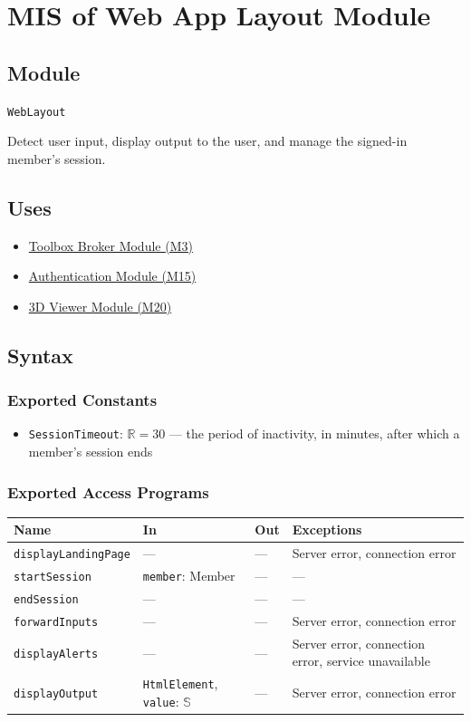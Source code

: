 \documentclass[12pt, titlepage]{article}
\begin{document}
\newpage

\section{MIS of Web App Layout Module} \label{mWebApp}

\subsection{Module}
\texttt{WebLayout}

Detect user input, display output to the user, and manage the signed-in member's session.

\subsection{Uses}
\begin{itemize}
  \item \hyperref[mBroker]{Toolbox Broker Module (M3)}
  \item \hyperref[mAuthn]{Authentication Module (M15)}
  \item \hyperref[mViewer]{3D Viewer Module (M20)}
\end{itemize}

\subsection{Syntax}

\subsubsection{Exported Constants}
\begin{itemize}
  \item \texttt{SessionTimeout}: $\mathbb{R} = 30$ --- the period of inactivity, in minutes, after which a member's session ends
\end{itemize}

\subsubsection{Exported Access Programs}
\begin{tabularx}{\textwidth}{p{4cm} p{4cm} p{2.3cm} X}
\toprule
\textbf{Name} & \textbf{In} & \textbf{Out} & \textbf{Exceptions} \\
\midrule
\texttt{displayLandingPage} & --- & --- & Server error, connection error \\
\texttt{startSession} & \texttt{member}: Member & --- & --- \\
\texttt{endSession} & --- & --- & --- \\
\texttt{forwardInputs} & --- & --- & Server error, connection error \\
\texttt{displayAlerts} & --- & --- & Server error, connection error, service unavailable \\
\texttt{displayOutput} & \texttt{HtmlElement}, \texttt{value}: $\mathbb{S}$ & --- & Server error, connection error \\
\bottomrule
\end{tabularx}
\end{document}

